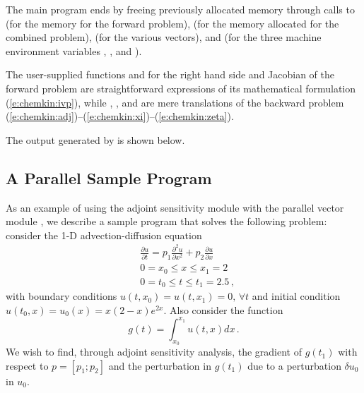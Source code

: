 The main program ends by freeing previously allocated memory through calls to 
 (for the {\cvodes} memory for the forward problem),  
(for the memory allocated for the combined problem),  
(for the various vectors), and  (for the three machine 
environment variables , , and ).

The user-supplied functions  and  for the right hand side and
Jacobian of the forward problem are straightforward expressions of its 
mathematical formulation (\ref{e:chemkin:ivp}), while , , and 
are mere translations of the backward problem
(\ref{e:chemkin:adj})--(\ref{e:chemkin:xi})--(\ref{e:chemkin:zeta}).

The output generated by  is shown below.
{\small}


\subsection{A Parallel Sample Program}\label{ss:parallel_adj_ex}

As an example of using the {\cvodes} adjoint sensitivity module with
the parallel vector module {\nvecp}, we describe a sample program
that solves the following problem: consider the 1-D advection-diffusion
equation
\begin{equation}\label{e:pvanx:orig_pde}
  \begin{split}
    & \frac{\partial u}{\partial t} = p_1 \frac{\partial^2 u}{\partial x^2} 
    + p_2 \frac{\partial u}{\partial x} \\
    & 0 = x_0 \le x \le x_1 = 2 \\
    & 0 = t_0 \le t \le t_1 = 2.5 \, ,
  \end{split}
\end{equation}
with boundary conditions $u(t,x_0) = u(t,x_1) = 0 ,\, \forall t$
and initial condition $u(t_0 , x) = u_0(x) = x(2-x)e^{2x}$. Also
consider the function
\begin{equation*}
  g(t) = \int_{x_0}^{x_1} u(t,x) dx \, .
\end{equation*}
We wish to find, through adjoint sensitivity analysis, the gradient of
$g(t_1)$ with respect to $p = [p_1 ; p_2]$ and the perturbation in $g(t_1)$
due to a perturbation $\delta u_0$ in $u_0$.

